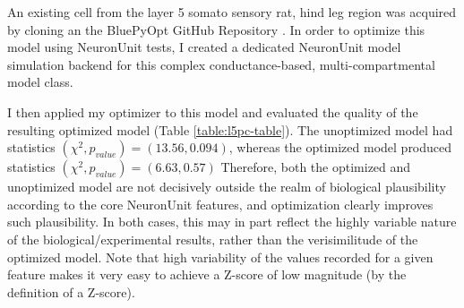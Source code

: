 An existing cell from the layer 5 somato sensory rat, hind leg region was acquired by cloning an the BluePyOpt GitHub Repository \citep{van2016bluepyopt}.
In order to optimize this model using NeuronUnit tests, I created a dedicated NeuronUnit model simulation backend for this complex conductance-based, multi-compartmental model class.

I then applied my optimizer to this model and evaluated the quality of the resulting optimized model (Table \ref{table:l5pc-table}).
The unoptimized model had statistics $(\chi^{2},p_{value})=(13.56, 0.094)$, whereas the optimized model produced statistics $(\chi^{2},p_{value})=(6.63, 0.57)$
Therefore, both the optimized and unoptimized model are not decisively outside the realm of biological plausibility according to the core NeuronUnit features, and optimization clearly improves such plausibility.
In both cases, this may in part reflect the highly variable nature of the biological/experimental results, rather than the verisimilitude of the optimized model.
Note that high variability of the values recorded for a given feature makes it very easy to achieve a Z-score of low magnitude (by the definition of a Z-score).

